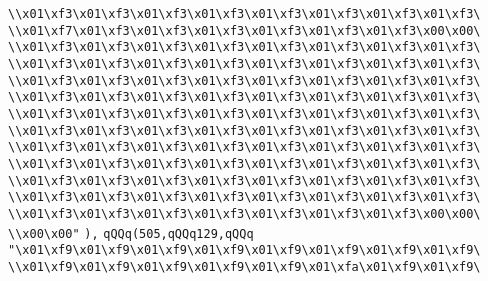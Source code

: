 \verb|\\x01\xf3\x01\xf3\x01\xf3\x01\xf3\x01\xf3\x01\xf3\x01\xf3\x01\xf3\|\newline
\verb|\\x01\xf7\x01\xf3\x01\xf3\x01\xf3\x01\xf3\x01\xf3\x01\xf3\x00\x00\|\newline
\verb|\\x01\xf3\x01\xf3\x01\xf3\x01\xf3\x01\xf3\x01\xf3\x01\xf3\x01\xf3\|\newline
\verb|\\x01\xf3\x01\xf3\x01\xf3\x01\xf3\x01\xf3\x01\xf3\x01\xf3\x01\xf3\|\newline
\verb|\\x01\xf3\x01\xf3\x01\xf3\x01\xf3\x01\xf3\x01\xf3\x01\xf3\x01\xf3\|\newline
\verb|\\x01\xf3\x01\xf3\x01\xf3\x01\xf3\x01\xf3\x01\xf3\x01\xf3\x01\xf3\|\newline
\verb|\\x01\xf3\x01\xf3\x01\xf3\x01\xf3\x01\xf3\x01\xf3\x01\xf3\x01\xf3\|\newline
\verb|\\x01\xf3\x01\xf3\x01\xf3\x01\xf3\x01\xf3\x01\xf3\x01\xf3\x01\xf3\|\newline
\verb|\\x01\xf3\x01\xf3\x01\xf3\x01\xf3\x01\xf3\x01\xf3\x01\xf3\x01\xf3\|\newline
\verb|\\x01\xf3\x01\xf3\x01\xf3\x01\xf3\x01\xf3\x01\xf3\x01\xf3\x01\xf3\|\newline
\verb|\\x01\xf3\x01\xf3\x01\xf3\x01\xf3\x01\xf3\x01\xf3\x01\xf3\x01\xf3\|\newline
\verb|\\x01\xf3\x01\xf3\x01\xf3\x01\xf3\x01\xf3\x01\xf3\x01\xf3\x01\xf3\|\newline
\verb|\\x01\xf3\x01\xf3\x01\xf3\x01\xf3\x01\xf3\x01\xf3\x01\xf3\x00\x00\|\newline
\verb|\\x00\x00"|\newline
\verb|),|\newline
\verb|qQQq(505,qQQq129,qQQq|\newline
\verb|"\x01\xf9\x01\xf9\x01\xf9\x01\xf9\x01\xf9\x01\xf9\x01\xf9\x01\xf9\|\newline
\verb|\\x01\xf9\x01\xf9\x01\xf9\x01\xf9\x01\xf9\x01\xfa\x01\xf9\x01\xf9\|\newline
